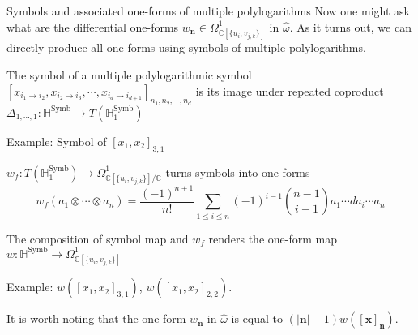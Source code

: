 \documentclass[8pt]{beamer}
\DeclareMathOperator{\Symb}{Symb}
\theoremstyle{definition}
\theoremstyle{remark}
\begin{document}
\begin{frame}[t]{Symbols and associated one-forms of multiple polylogarithms}
Now one might ask what are the differential one-forms $w_{\mathbf n}\in\Omega^1_{\mathbb C[\{u_i,v_{j,k}\}]}$ in $\widehat{\omega}$. As it turns out, we can directly produce all one-forms using symbols of multiple polylogarithms.
\begin{definition}
The symbol of a multiple polylogarithmic symbol $[x_{i_1\to i_2}, x_{i_2\to i_3},\cdots,x_{i_d\to i_{d+1}}]_{n_1,n_2,\cdots,n_d}$ is its image under repeated coproduct $\Delta_{1,\cdots,1}:\mathbb H^{\Symb}\to T(\mathbb H^{\Symb}_1)$
\end{definition}
Example: Symbol of $[x_1,x_2]_{3,1}$
\begin{definition}
$w_f:T(\mathbb H^{\Symb}_1)\to\Omega^1_{\mathbb C[\{u_i,v_{j,k}\}]/\mathbb C}$ turns symbols into one-forms
\begin{equation}\label{eq: w_f}
w_f(a_1\otimes\cdots\otimes a_n)=\frac{(-1)^{n+1}}{n!}\sum_{1\leq i\leq n}(-1)^{i-1}\binom{n-1}{i-1}a_1\cdots da_i\cdots a_n
\end{equation}
\end{definition}
The composition of symbol map and $w_f$ renders the one-form map $w:\mathbb H^{\Symb}\to\Omega^1_{\mathbb C[\{u_i,v_{j,k}\}]}$
\vspace{10pt}

Example: $w([x_1,x_2]_{3,1})$, $w([x_1,x_2]_{2,2})$.
\vspace{10pt}

It is worth noting that the one-form $w_{\mathbf n}$ in $\widehat{\omega}$ is equal to $(|\mathbf n|-1)w([\mathbf x]_{\mathbf n})$.
\end{frame}
\end{document}
